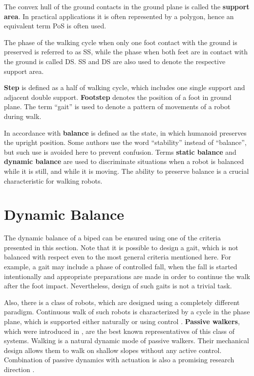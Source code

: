 The convex hull of the ground contacts in the ground plane is called the {\bf support area}.
In practical applications it is often represented by a polygon, hence an equivalent term 
\ac{PoS} is often used. 

The phase of the walking cycle when only one foot contact with the ground is preserved is
referred to as \ac{SS}, while the phase when both feet are in contact with the ground 
is called \ac{DS}. \ac{SS} and \ac{DS} are also used to denote the respective support area.

{\bf Step} is defined as a half of walking cycle, which includes one single support 
and adjacent double support. {\bf Footstep} denotes the position of a foot in ground plane.
The term ``gait'' is used to denote a pattern of movements of a robot during walk.

In accordance with \cite{VukHumanoidTerms} {\bf balance} is defined as the state, in which 
humanoid preserves the upright position. Some authors use the word ``stability'' instead of 
``balance'', but such use is avoided here to prevent confusion. Terms {\bf static balance} 
and {\bf dynamic balance} are used to discriminate situations when a robot is balanced
while it is still, and while it is moving. The ability to preserve balance is a crucial 
characteristic for walking robots. 


\section{Dynamic Balance}
The dynamic balance of a biped can be ensured using one of the criteria presented
in this section. Note that it is possible to design a gait, which is not balanced
with respect even to the most general criteria mentioned here. For example, a gait
may include a phase of controlled fall, when the fall is started intentionally and 
appropriate preparations are made in order to continue the walk after the foot impact.
Nevertheless, design of such gaits is not a trivial task.

Also, there is a class of robots, which are designed using a completely different
paradigm. Continuous walk of such robots is characterized by a cycle in the phase 
plane, which is supported either naturally or using control \cite{KajitaLegged}. 
{\bf Passive walkers}, which were introduced in \cite{McGeer}, are the best known 
representatives of this class of systems. Walking is a natural dynamic mode of 
passive walkers. Their mechanical design allows them to walk on shallow slopes 
without any active control. Combination of passive dynamics with actuation is also 
a promising research direction \cite{CollinsPassive}. 



